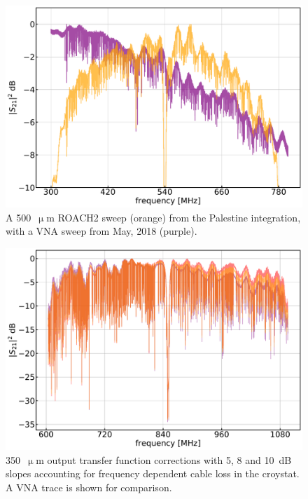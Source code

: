 \begin{figure}[!htbp]
\centering
\includegraphics[width=\textwidth]{figures/blast_data/sweeps/500_VNA_overplot}
\caption[~A 500~ ROACH2 sweep from the Palestine integration, with a VNA sweep from May, 2018.]{A 500~$\upmu$m ROACH2 sweep (orange) from the Palestine integration, with a VNA sweep from May, 2018 (purple).}
\label{fig:VNA comp 500}
\end{figure}

\begin{figure}[!htbp]
\centering
\includegraphics[width=\textwidth]{figures/blast_data/sweeps/trf_slopes}
\caption[~350~ output transfer function corrections with slopes of 5, 8 and 10~dB.]{350~$\upmu$m output transfer function corrections with 5, 8 and 10~dB slopes accounting for frequency dependent cable loss in the croystat. A VNA trace is shown for comparison.}
\label{fig:trf slopes}
\end{figure}

